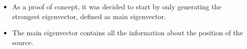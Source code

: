 \documentclass[12pt,pdftex,16x10]{elpres} %
\begin{document}
\begin{psli}
  \begin{itemize}
    \item As a proof of concept, it was decided to start by only generating the strongest eigenvector, defined as main eigenvector.
    \item The main eigenvector contains all the information about the position of the source. %
  \end{itemize}

  \begin{table}[h]
    \centering
    \begin{minipage}[b][0.3\textheight][t]{0.45\textwidth}
        \caption{Generator}


\end{minipage}
\end{table}
\end{psli}
\end{document}
